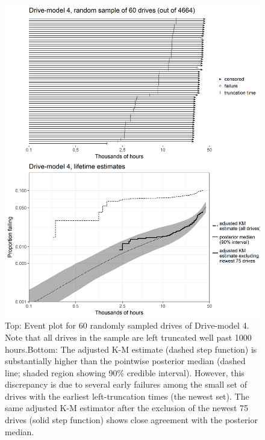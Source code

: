 \documentclass[12pt]{article}
\begin{document}
\begin{figure}
\centering
\includegraphics[height=.8\textheight]{dm4-exception.png}
\caption{\footnotesize Top: Event plot for 60 randomly sampled drives of Drive-model 4. Note that all drives in the sample are left truncated well past 1000 hours.\hspace{\textwidth}Bottom: The adjusted K-M estimate (dashed step function) is substantially higher than the pointwise posterior median (dashed line; shaded region showing 90\% credible interval). However, this discrepancy is due to several early failures among the small set of drives with the earliest left-truncation times (the newest set). The same adjusted K-M estimator after the exclusion of the newest 75 drives (solid step function) shows close agreement with the posterior median.}

\label{fig:ex-mod-4}
\end{figure}
\end{document}
